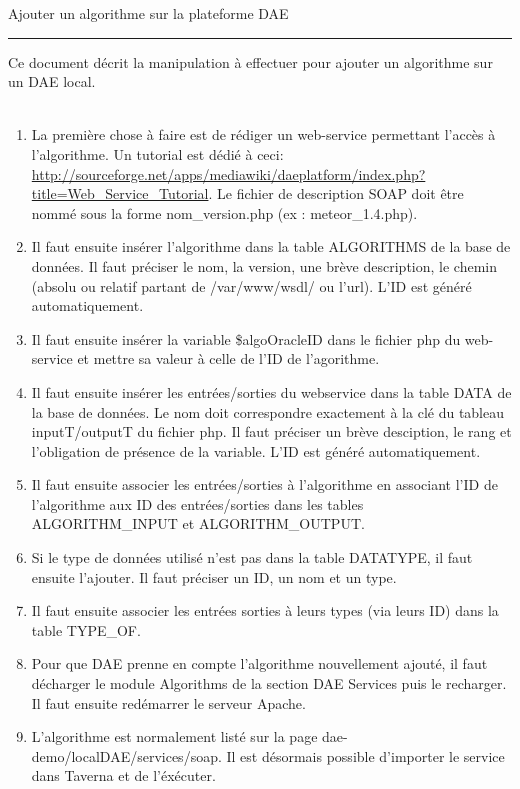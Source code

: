 \documentclass[12pt]{report}
\newcommand{\HRule}{\rule{\linewidth}{0.5mm}}
\begin{document}
    \begin{center}
        \Huge{Ajouter un algorithme sur la plateforme DAE}
        \HRule
    \end{center}

    Ce document décrit la manipulation à effectuer pour ajouter un algorithme sur un DAE local.\\
    \\
    \begin{enumerate}
        \item La première chose à faire est de rédiger un web-service permettant l'accès à l'algorithme. Un tutorial est dédié à ceci: \url{http://sourceforge.net/apps/mediawiki/daeplatform/index.php?title=Web\_Service\_Tutorial}. Le fichier de description SOAP doit être nommé sous la forme nom\_version.php (ex : meteor\_1.4.php). 
        \item Il faut ensuite insérer l'algorithme dans la table ALGORITHMS de la base de données. Il faut préciser le nom, la version, une brève description, le chemin (absolu ou relatif partant de /var/www/wsdl/ ou l'url). L'ID est généré automatiquement.
        \item Il faut ensuite insérer la variable \$algoOracleID dans le fichier php du web-service et mettre sa valeur à celle de l'ID de l'agorithme.
        \item Il faut ensuite insérer les entrées/sorties du webservice dans la table DATA de la base de données. Le nom doit correspondre exactement à la clé du tableau inputT/outputT du fichier php. Il faut préciser un brève desciption, le rang et l'obligation de présence de la variable. L'ID est généré automatiquement.
        \item Il faut ensuite associer les entrées/sorties à l'algorithme en associant l'ID de l'algorithme aux ID des entrées/sorties dans les tables ALGORITHM\_INPUT et ALGORITHM\_OUTPUT.
        \item Si le type de données utilisé n'est pas dans la table DATATYPE, il faut ensuite l'ajouter. Il faut préciser un ID, un nom et un type.
        \item Il faut ensuite associer les entrées sorties à leurs types (via leurs ID) dans la table TYPE\_OF.
        \item Pour que DAE prenne en compte l'algorithme nouvellement ajouté, il faut décharger le module Algorithms de la section DAE Services puis le recharger. Il faut ensuite redémarrer le serveur Apache.
        \item L'algorithme est normalement listé sur la page dae-demo/localDAE/services/soap. Il est désormais possible d'importer le service dans Taverna et de l'éxécuter.
        
    \end{enumerate}
    
\end{document}
